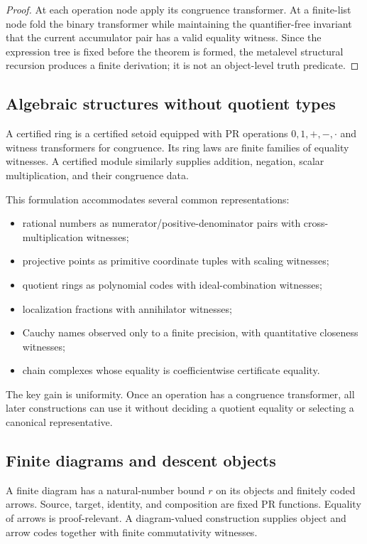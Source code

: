 \begin{proof}
At each operation node apply its congruence transformer.  At a finite-list node fold the binary
transformer while maintaining the quantifier-free invariant that the current accumulator pair has a
valid equality witness.  Since the expression tree is fixed before the theorem is formed, the
metalevel structural recursion produces a finite derivation; it is not an object-level truth
predicate.
\end{proof}

\subsection{Algebraic structures without quotient types}

A certified ring is a certified setoid equipped with PR operations $0,1,+,-,\cdot$ and witness
transformers for congruence.  Its ring laws are finite families of equality witnesses.  A certified
module similarly supplies addition, negation, scalar multiplication, and their congruence data.

This formulation accommodates several common representations:

\begin{itemize}
\item rational numbers as numerator/positive-denominator pairs with cross-multiplication witnesses;
\item projective points as primitive coordinate tuples with scaling witnesses;
\item quotient rings as polynomial codes with ideal-combination witnesses;
\item localization fractions with annihilator witnesses;
\item Cauchy names observed only to a finite precision, with quantitative closeness witnesses;
\item chain complexes whose equality is coefficientwise certificate equality.
\end{itemize}

The key gain is uniformity.  Once an operation has a congruence transformer, all later constructions
can use it without deciding a quotient equality or selecting a canonical representative.

\subsection{Finite diagrams and descent objects}

A finite diagram has a natural-number bound $r$ on its objects and finitely coded arrows.  Source,
target, identity, and composition are fixed PR functions.  Equality of arrows is proof-relevant.
A diagram-valued construction supplies object and arrow codes together with finite commutativity
witnesses.

